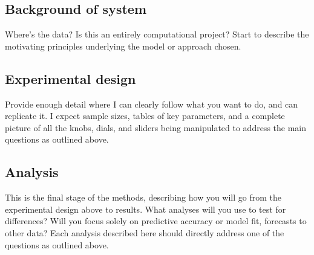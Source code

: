 \documentclass[a4paper,11pt]{article}
\begin{document}
  \subsection*{Background of system}
Where's the data? Is this an entirely computational project? Start to describe the motivating principles underlying the model or approach chosen. 




  \subsection*{Experimental design}
Provide enough detail where I can clearly follow what you want to do, and can replicate it. I expect sample sizes, tables of key parameters, and a complete picture of all the knobs, dials, and sliders being manipulated to address the main questions as outlined above.




\subsection*{Analysis}

This is the final stage of the methods, describing how you will go from the experimental design above to results. What analyses will you use to test for differences? Will you focus solely on predictive accuracy or model fit, forecasts to other data? Each analysis described here should directly address one of the questions as outlined above. 
\end{document}
